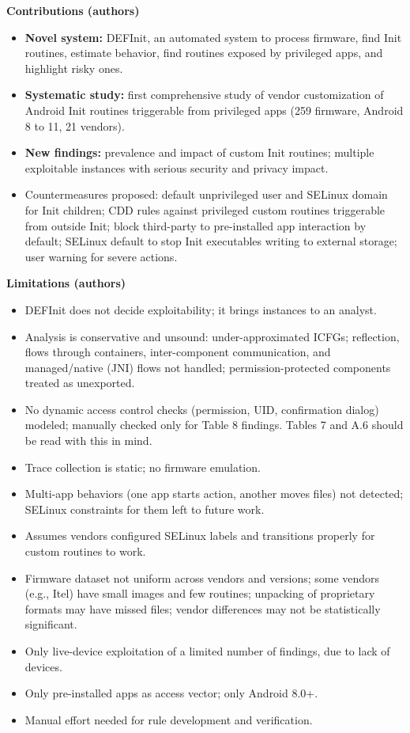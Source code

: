 \documentclass[11pt,a4paper]{article}
\begin{document}
\begin{enumerate}
    \textbf{Contributions (authors)}
    \begin{itemize}[leftmargin=*, itemsep=1pt, topsep=2pt]
        \item \textbf{Novel system:} DEFInit, an automated system to process firmware, find Init routines, estimate behavior, find routines exposed by privileged apps, and highlight risky ones.
        \item \textbf{Systematic study:} first comprehensive study of vendor customization of Android Init routines triggerable from privileged apps (259 firmware, Android 8 to 11, 21 vendors).
        \item \textbf{New findings:} prevalence and impact of custom Init routines; multiple exploitable instances with serious security and privacy impact.
        \item Countermeasures proposed: default unprivileged user and SELinux domain for Init children; CDD rules against privileged custom routines triggerable from outside Init; block third-party to pre-installed app interaction by default; SELinux default to stop Init executables writing to external storage; user warning for severe actions.
    \end{itemize}

    \vspace{4pt}
    \textbf{Limitations (authors)}
    \begin{itemize}[leftmargin=*, itemsep=1pt, topsep=2pt]
        \item DEFInit does not decide exploitability; it brings instances to an analyst.
        \item Analysis is conservative and unsound: under-approximated ICFGs; reflection, flows through containers, inter-component communication, and managed/native (JNI) flows not handled; permission-protected components treated as unexported.
        \item No dynamic access control checks (permission, UID, confirmation dialog) modeled; manually checked only for Table 8 findings. Tables 7 and A.6 should be read with this in mind.
        \item Trace collection is static; no firmware emulation.
        \item Multi-app behaviors (one app starts action, another moves files) not detected; SELinux constraints for them left to future work.
        \item Assumes vendors configured SELinux labels and transitions properly for custom routines to work.
        \item Firmware dataset not uniform across vendors and versions; some vendors (e.g., Itel) have small images and few routines; unpacking of proprietary formats may have missed files; vendor differences may not be statistically significant.
        \item Only live-device exploitation of a limited number of findings, due to lack of devices.
        \item Only pre-installed apps as access vector; only Android 8.0+.
        \item Manual effort needed for rule development and verification.
    \end{itemize}


\end{enumerate}
\end{document}
